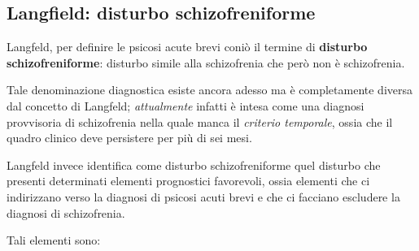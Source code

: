 \subsection{Langfield: disturbo schizofreniforme}

Langfeld, per definire le psicosi acute brevi coniò il termine di
\textbf{disturbo schizofreniforme}: disturbo simile alla schizofrenia
che però non è schizofrenia.

Tale denominazione diagnostica esiste ancora adesso ma è completamente
diversa dal concetto di Langfeld; \emph{\emph{attualmente}} infatti è
intesa come una diagnosi provvisoria di schizofrenia nella quale manca
il \emph{criterio temporale}, ossia che il quadro clinico deve
persistere per più di sei mesi.

Langfeld invece identifica come disturbo schizofreniforme quel disturbo
che presenti determinati elementi prognostici favorevoli, ossia elementi
che ci indirizzano verso la diagnosi di psicosi acuti brevi e che ci
facciano escludere la diagnosi di schizofrenia.

Tali elementi sono:

